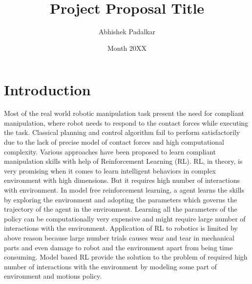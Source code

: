 \documentclass[thesis]{mas_proposal}
\title{Project Proposal Title}
\author{Abhishek Padalkar}
\date{Month 20XX}
\begin{document}
\maketitle

\pagestyle{plain}

\chapter{Introduction}
Most of the real world robotic manipulation task present the need for compliant manipulation, where robot needs to respond to the contact forces while executing the task. Classical planning and control algorithm fail to perform satisfactorily due to the lack of precise model of contact forces and high computational complexity. Various approaches have been proposed to learn compliant manipulation skills with help of Reinforcement Learning (RL). RL, in theory, is very promising when it comes to learn intelligent behaviors in complex environment with high dimensions. But it requires high number of interactions with environment. In model free reinforcement learning, a agent learns the skills by exploring the environment and adopting the parameters which governs the trajectory of the agent in the environment. Learning all the parameters of the policy can be computationally very expensive and might require large number of interactions with the environment. Application of RL to robotics is limited by above reason because large number trials causes wear and tear in mechanical parts and even damage to robot and the environment apart from being time consuming. Model based RL provide the solution to the problem of required high number of interactions with the environment by modeling some part of environment and motions policy. 
\end{document}
